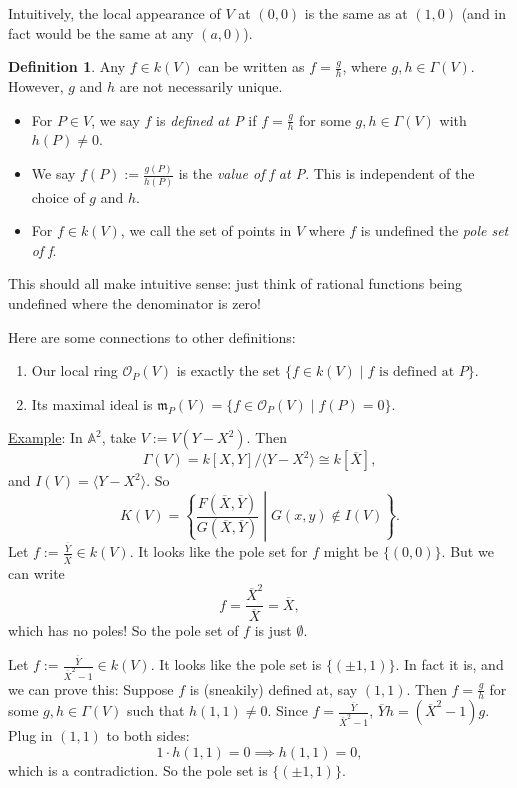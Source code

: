 \documentclass[12pt]{article}
\newcommand{\ita}[1]{\textit{#1}}
\newcommand{\vbrack}[1]{\langle #1\rangle}
\theoremstyle{definition}
\newtheorem{definition}[theorem]{Definition}
\begin{document}
Intuitively, the local appearance of $V$ at $(0,0)$ is the same as at $(1,0)$ (and in fact would be the same at any $(a,0)$). 
\begin{definition}
    Any $f\in k(V)$ can be written as $f=\frac{g}{h}$, where $g,h\in\Gamma(V)$. However, $g$ and $h$ are not necessarily unique.
    \begin{itemize}
        \item  For $P\in V$, we say $f$ is \ita{defined at P} if $f=\frac{g}{h}$ for some $g,h\in\Gamma(V)$ with $h(P)\neq0$.
        \item We say $f(P):=\frac{g(P)}{h(P)}$ is the \ita{value of f at P}. This is independent of the choice of $g$ and $h$.
        \item For $f\in k(V)$, we call the set of points in $V$ where $f$ is undefined the \ita{pole set of f}.
    \end{itemize}
\end{definition}
This should all make intuitive sense: just think of rational functions being undefined where the denominator is zero!

Here are some connections to other definitions:
\begin{enumerate}
    \item Our local ring $\mathcal{O}_P(V)$ is exactly the set $\{f\in k(V)\mid f\text{ is defined at }P\}$.
    \item Its maximal ideal is $\mathfrak{m}_P(V)=\{f\in\mathcal{O}_P(V)\mid f(P)=0\}$.
\end{enumerate}
\underline{Example}: In $\mathbb{A}^2$, take $V:=V(Y-X^2)$. Then 
\[\Gamma(V)=k[X,Y]/\vbrack{Y-X^2}\cong k[\overline{X}],\]
and $I(V)=\vbrack{Y-X^2}$. So 
\[K(V)=\left\{\frac{F(\overline{X},\overline{Y})}{G(\overline{X},\overline{Y})}\middle|G(x,y)\notin I(V)\right\}.\]
Let $f:=\frac{\overline{Y}}{\overline{X}}\in k(V)$. It looks like the pole set for $f$ might be $\{(0,0)\}$. But we can write
\[f=\frac{\overline{X}^2}{\overline{X}}=\overline{X},\]
which has no poles! So the pole set of $f$ is just $\emptyset$.

Let $f:=\frac{\overline{Y}}{\overline{X}^2-1}\in k(V)$. It looks like the pole set is $\{(\pm1,1)\}$. In fact it is, and we can prove this: Suppose $f$ is (sneakily) defined at, say $(1,1)$. Then $f=\frac{g}{h}$ for some $g,h\in\Gamma(V)$ such that $h(1,1)\neq0$. Since $f=\frac{\overline{Y}}{\overline{X}^2-1}$, $\overline{Y}h=(\overline{X}^2-1)g$. Plug in $(1,1)$ to both sides:
\[1\cdot h(1,1)=0\implies h(1,1)=0,\]
which is a contradiction. So the pole set is $\{(\pm1,1)\}$.
\end{document}
